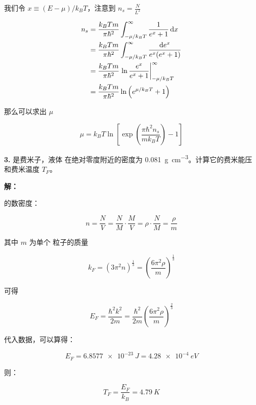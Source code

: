 我们令 $x\equiv(E-\mu)/k_B T$，注意到 $n_s=\frac{N}{L^2}$

\begin{align*}
    n_s &= \frac{k_B T m}{\pi\hbar^2} \int_{-\mu/k_B T}^{\infty} \frac{1}{e^x+1} \mathop{}\!\mathrm{d} x \\
    &= \frac{k_B T m}{\pi\hbar^2} \int_{-\mu/k_B T}^{\infty} \frac{\mathop{}\!\mathrm{d} e^x}{e^x(e^x+1)} \\
    &= \frac{k_B T m}{\pi\hbar^2} \left. \ln\frac{e^x}{e^x+1} \right|_{-\mu/k_B T}^{\infty} \\
    &= \frac{k_B T m}{\pi\hbar^2} \ln \left(e^{\mu/k_B T}+1\right)
\end{align*}

那么可以求出 $\mu$

\begin{equation*}
    \mu = k_B T \ln \left[\exp\left(\frac{\pi\hbar^2 n_s}{m k_B T}\right)-1\right]
\end{equation*}

\noindent \textbf{3.\quad}  是费米子，液体  在绝对零度附近的密度为 \qty{0.081}{g.cm^{-3}}。计算它的费米能压和费米温度 $T_F$。

\noindent \textbf{解：}

 的数密度：

\begin{equation*}
    n = \frac{N}{V} = \frac{N}{M} \cdot \frac{M}{V} = \rho \cdot \frac{N}{M} = \frac{\rho}{m}
\end{equation*}

其中 $m$ 为单个  粒子的质量

\begin{equation*}
    k_F = (3\pi^2 n)^{\frac{1}{3}} = \left(\frac{6\pi^2 \rho}{m}\right)^{\frac{1}{3}}
\end{equation*}

可得

\begin{equation*}
    E_F = \frac{\hbar^2 k^2}{2m} = \frac{\hbar^2}{2m} \left(\frac{6\pi^2 \rho}{m}\right)^{\frac{2}{3}}
\end{equation*}

代入数据，可以算得：

\begin{equation*}
    E_F = \qty{6.8577e-23}{J} = \qty{4.28e-4}{eV}
\end{equation*}

则：

\begin{equation*}
    T_F = \frac{E_F}{k_B} = \qty{4.79}{K}
\end{equation*}

